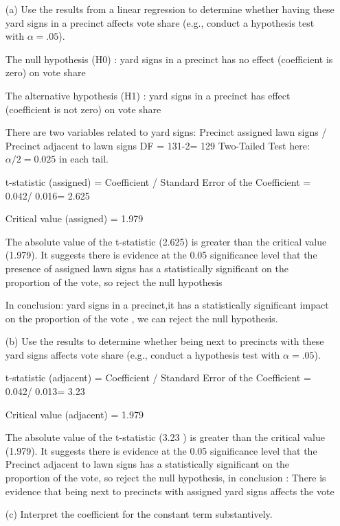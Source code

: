 \documentclass[12pt,letterpaper]{article}
\begin{document}
\vspace{.5cm}
\begin{enumerate}
	\item [(a)] Use the results from a linear regression to determine whether having these yard signs in a precinct affects vote share (e.g., conduct a hypothesis test with $\alpha = .05$).
 
The null hypothesis (H0) :   yard signs in a precinct  has no effect (coefficient is zero) on  vote share

The alternative hypothesis (H1) :  yard signs in a precinct  has effect (coefficient is 
 not zero) on  vote share

 There are two variables related to yard signs: Precinct assigned lawn signs / Precinct adjacent to lawn signs
\newpage
DF = 131-2= 129    Two-Tailed Test here: $\alpha/2= 0.025$  in each tail.

 t-statistic (assigned) = Coefficient / Standard Error of the Coefficient = 
 0.042/ 0.016= 2.625

Critical value (assigned) = 1.979

The absolute value of the t-statistic (2.625) is greater than the critical value (1.979). It suggests there is evidence at the 0.05 significance level that the presence of assigned lawn signs has a statistically significant  on the proportion of the vote, so reject the null hypothesis


In conclusion: 
yard signs in a precinct,it has a statistically significant impact on the proportion of the vote , we can reject the null hypothesis.
 
 
	\item [(b)]  Use the results to determine whether being
	next to precincts with these yard signs affects vote
	share (e.g., conduct a hypothesis test with $\alpha = .05$).

t-statistic (adjacent) = Coefficient / Standard Error of the Coefficient = 
 0.042/ 0.013= 3.23

Critical value (adjacent) = 1.979

The absolute value of the t-statistic (3.23 ) is greater than the critical value (1.979). It suggests there is evidence at the 0.05 significance level that the Precinct adjacent to lawn signs has a statistically significant  on the proportion of the vote, so reject the null hypothesis, in conclusion : There is evidence that being next to precincts with assigned  yard signs affects the vote 


 
	\vspace{1cm}
	\item [(c)] Interpret the coefficient for the constant term substantively.
	\vspace{1cm}


\end{enumerate}
\end{document}
